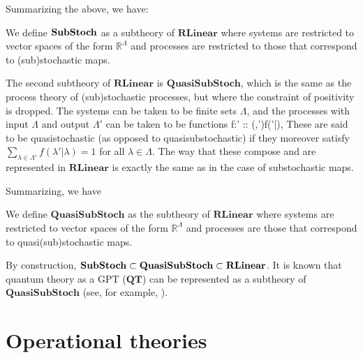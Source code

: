 \documentclass[onecolum,aps,groupedaddress,nofootinbib]{revtex4-2}
\newcommand\RL{\mathbf{RLinear}}
\newcommand\QSS{\mathbf{QuasiSubStoch}}
\newcommand\SubS{\bf{SubStoch}}
\begin{document}
Summarizing the above, we have:
\begin{example}[$\SubS$]
We define $\SubS$ as a subtheory of $\RL$ where systems are restricted to vector spaces of the form $\mathds{R}^\Lambda$ and processes are restricted to those that correspond to (sub)stochastic maps.
\end{example}

The second subtheory of $\RL$ is $\QSS$, which is the same as the process theory of (sub)stochastic processes, but where the constraint of positivity is dropped. The systems can be taken to be finite sets $\Lambda$, and the processes with input $\Lambda$ and output $\Lambda'$ can be taken to be
functions
\beq
f:\Lambda\times \Lambda' \to {} :: (\lambda,\lambda')\mapsto f(\lambda'|\lambda),
\eeq
These are said to be quasistochastic (as opposed to quasisubstochastic) if they moreover satisfy  $\sum_{\lambda\in\Lambda'}f(\lambda'|\lambda) = 1$ for all $\lambda\in\Lambda$. The way that these compose and are represented in $\RL$ is exactly the same as in the case of substochastic maps.

Summarizing, we have
\begin{example}[$\QSS$]
We define $\QSS$ as the subtheory of $\RL$ where systems are restricted to vector spaces of the form $\mathds{R}^\Lambda$ and processes are those that correspond to quasi(sub)stochastic maps.
\end{example}

By construction, $\SubS \subset \QSS \subset \RL$. It is known that quantum theory as a GPT ($\mathbf{QT}$) can be represented as a subtheory of $\QSS$ (see, for example, \cite{van2017quantum}).

\section{Operational theories}
\end{document}

